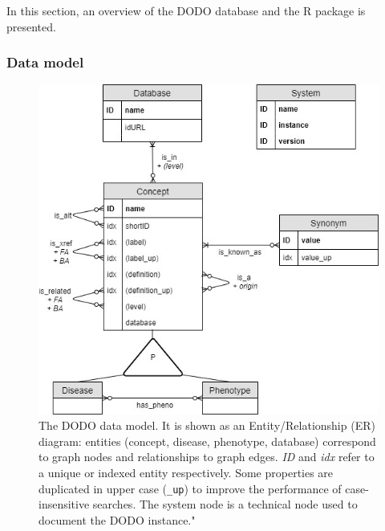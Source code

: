 \documentclass[9pt,a4paper,]{extarticle}
\begin{document}
In this section, an overview of the DODO database and the R package is presented.

\hypertarget{data-model}{%
\subsubsection{Data model}\label{data-model}}



\begin{figure}

{\centering \includegraphics[width=0.5\linewidth]{DODO-F1000-publication_files/figure-latex/Figure1} 

}

\caption{The DODO data model. It is shown as an Entity/Relationship (ER) diagram: entities (concept, disease, phenotype, database) correspond to graph nodes and relationships to graph edges. \emph{ID} and \emph{idx} refer to a unique or indexed entity respectively. Some properties are duplicated in upper case (\texttt{\_up}) to improve the performance of case-insensitive searches. The system node is a technical node used to document the DODO instance."}\label{fig:dataModel}
\end{figure}
\end{document}
